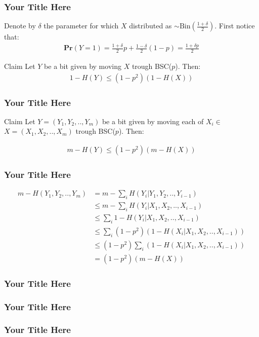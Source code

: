 \documentclass{beamer}
\begin{document}
\begin{frame}
  \frametitle{Your Title Here}
  Denote by $\delta$ the parameter for which $X$ distributed as $\sim \text{Bin}(\frac{1+\delta}{2})$. First notice that:  
  \begin{equation*}
    \begin{split}
      \textbf{Pr}\left( Y = 1 \right) = \frac{1+\delta}{2} p + \frac{1-\delta}{2}(1-p) = \frac{1 + \delta p}{2}  
    \end{split}
  \end{equation*}
\begin{block}{Claim}
  Let $Y$ be a bit given by moving $X$ trough BSC($p$). Then:
  \begin{equation*}
    \begin{split}
      1 - H(Y) \le \left( 1 - p^{2} \right)\left( 1 - H(X) \right)
    \end{split}
  \end{equation*}
\end{block}

\end{frame}
\begin{frame}
  \frametitle{Your Title Here}
  
\begin{block}{Claim}
  Let $Y = \left(Y_{1}, Y_{2}, .., Y_{m}\right)$ be a bit given by moving each of $X_i \in$ $X = \left(X_{1}, X_{2}, .., X_{m}\right)$  trough BSC($p$). Then:

  \begin{equation*}
    \begin{split}
      m - H(Y) \le \left( 1 - p^{2} \right)\left( m - H(X) \right)
    \end{split}
  \end{equation*}
\end{block}

\end{frame}
\begin{frame}
  \frametitle{Your Title Here}
  
  \begin{equation*}
    \begin{split}
      m - H\left( Y_{1}, Y_{2}, .., Y_{m} \right) &= m - \sum_{i} H\left( Y_{i} | Y_{1}, Y_{2}, .., Y_{i-1} \right) \\ 
      & \le m - \sum_{i} H\left( Y_{i} | X_{1}, X_{2}, .., X_{i-1} \right) \\ 
      & \le \sum_{i} 1 - H\left( Y_{i} | X_{1}, X_{2}, .., X_{i-1} \right) \\ 
      & \le \sum_{i} \left( 1 - p^{2} \right)\left(1 - H\left( X_{i} | X_{1}, X_{2}, .., X_{i-1} \right)\right) \\ 
      & \le \left( 1 - p^{2} \right) \sum_{i} \left(1 - H\left( X_{i} | X_{1}, X_{2}, .., X_{i-1} \right)\right)  \\
      &= \left( 1 - p^{2} \right) \left( m - H\left( X \right) \right)
    \end{split}
  \end{equation*}
\end{frame}
\begin{frame}
  \frametitle{Your Title Here}
\end{frame}
\begin{frame}
  \frametitle{Your Title Here}
\end{frame}
\begin{frame}
  \frametitle{Your Title Here}
\end{frame}
\end{document}
